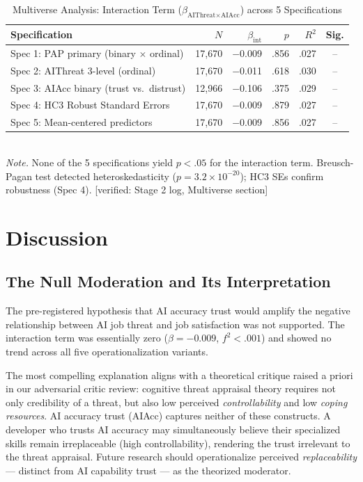 \documentclass[11pt]{article}
\begin{document}
\begin{table}[h!]
  \centering
  \caption{Multiverse Analysis: Interaction Term ($\beta_{\text{AIThreat} \times
    \text{AIAcc}}$) across 5 Specifications}
  \label{tab:multiverse}
  \small
  \begin{tabular}{lrrrrc}
    \toprule
    Specification & $N$ & $\beta_{\text{int}}$ & $p$ & $R^2$ & Sig. \\
    \midrule
    Spec 1: PAP primary (binary $\times$ ordinal) & 17,670 & $-$0.009 & .856 & .027 & -- \\
    Spec 2: AIThreat 3-level (ordinal) & 17,670 & $-$0.011 & .618 & .030 & -- \\
    Spec 3: AIAcc binary (trust vs.\ distrust) & 12,966 & $-$0.106 & .375 & .029 & -- \\
    Spec 4: HC3 Robust Standard Errors & 17,670 & $-$0.009 & .879 & .027 & -- \\
    Spec 5: Mean-centered predictors & 17,670 & $-$0.009 & .856 & .027 & -- \\
    \bottomrule
  \end{tabular}
  \medskip\\
  \small \textit{Note.} None of the 5 specifications yield $p < .05$ for the interaction term.
  Breusch-Pagan test detected heteroskedasticity ($p = 3.2 \times 10^{-20}$);
  HC3 SEs confirm robustness (Spec 4). [verified: Stage 2 log, Multiverse section]
\end{table}

\section{Discussion}

\subsection{The Null Moderation and Its Interpretation}
The pre-registered hypothesis that AI accuracy trust would amplify the negative
relationship between AI job threat and job satisfaction was not supported.
The interaction term was essentially zero ($\beta = -0.009$, $f^2 < .001$)
and showed no trend across all five operationalization variants.

The most compelling explanation aligns with a theoretical critique raised a priori
in our adversarial critic review: cognitive threat appraisal theory requires not
only credibility of a threat, but also low perceived \textit{controllability} and
low \textit{coping resources}. AI accuracy trust (AIAcc) captures neither of these
constructs. A developer who trusts AI accuracy may simultaneously believe their
specialized skills remain irreplaceable (high controllability), rendering the trust
irrelevant to the threat appraisal. Future research should operationalize perceived
\textit{replaceability} --- distinct from AI capability trust --- as the theorized
moderator.
\end{document}
